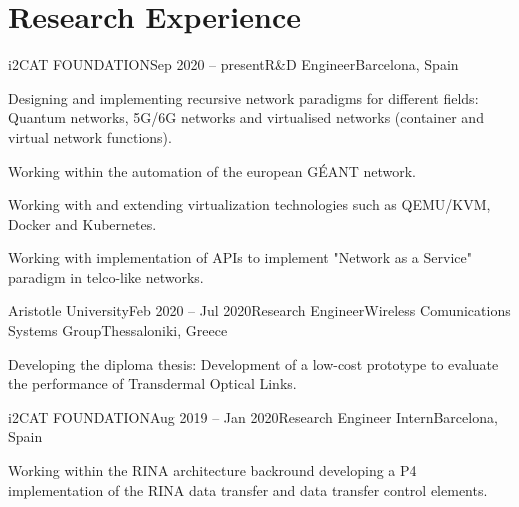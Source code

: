 \documentclass{resume}
\begin{document}
\section{Research Experience}
\begin{content}

    \begin{position}{i2CAT FOUNDATION}{Sep 2020 -- present}{R\&D Engineer}{}{Barcelona, Spain} %
    \item Designing and implementing recursive network paradigms for different fields: Quantum networks, 5G/6G networks and virtualised networks (container and virtual network functions).
    \item Working within the automation of the european GÉANT network.
    \item Working with and extending virtualization technologies such as QEMU/KVM, Docker and Kubernetes.
    \item Working with implementation of APIs to implement "Network as a Service" paradigm in telco-like networks.
    \end{position}

    \begin{position}{Aristotle University}{Feb 2020 -- Jul 2020}{Research Engineer}{Wireless Comunications Systems Group}{Thessaloniki, Greece} %
    \item Developing the diploma thesis: Development of a low-cost prototype to evaluate the performance of Transdermal Optical Links.
    \end{position}

    \begin{position}{
        i2CAT FOUNDATION}{Aug 2019 -- Jan 2020}{Research Engineer Intern}{}{Barcelona, Spain} %
    \item Working within the RINA architecture backround developing a P4 implementation of the RINA data transfer and data transfer control elements.
    \end{position}

\sectionlineskip
\end{content}
\vspace{-3\medskipamount}

\noindent
\renewcommand{\refname}{Publications}   %
\nocite{*} %
\sectionlineskip
\end{document}

